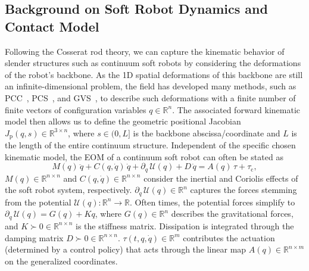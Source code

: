 \subsection{Background on Soft Robot Dynamics and Contact Model}
Following the Cosserat rod theory, we can capture the kinematic behavior of slender structures such as continuum soft robots by considering the deformations of the robot's backbone. As the 1D spatial deformations of this backbone are still an infinite-dimensional problem, the field has developed many methods, such as \gls{PCC}~\citep{webster2010design}, \gls{PCS}~\citep{renda2018discrete}, and \gls{GVS}~\citep{renda2020geometric}, to describe such deformations with a finite number of finite vectors of configuration variables $q \in \mathbb{R}^n$. The associated forward kinematic model then allows us to define the geometric positional Jacobian $J_\mathrm{p}(q, s) \in \mathbb{R}^{3 \times n}$, where $s \in (0,L]$ is the backbone abscissa/coordinate and $L$ is the length of the entire continuum structure.
Independent of the specific chosen kinematic model, the \gls{EOM} of a continuum soft robot can often be stated as~\citep{armanini2023soft, della2023model}
\begin{equation}\label{eq:safetymetric:soft_robot_configuration_space_dynamics}
    M(q) \, \ddot{q} + C(q, \dot{q}) \, \dot{q} + \partial_{q} \, \mathcal{U}(q) + D \, \dot{q} = A(q) \, \tau + \tau_\mathrm{c},
\end{equation}
$M(q) \in \mathbb{R}^{n \times n}$ and $C(q, \dot{q}) \in \mathbb{R}^{n \times n}$ consider the inertial and Coriolis effects of the soft robot system, respectively.
$\partial_{q} \, \mathcal{U}(q) \in \mathbb{R}^n$ captures the forces stemming from the potential $\mathcal{U}(q): \mathbb{R}^n \to \mathbb{R}$.
Often times, the potential forces simplify to $\partial_{q} \, \mathcal{U}(q) =  G(q) + K q$, where $G(q) \in \mathbb{R}^{n}$ describes the gravitational forces, and $K \succ 0 \in \mathbb{R}^{n \times n}$ is the stiffness matrix.
Dissipation is integrated through the damping matrix $D \succ 0 \in \mathbb{R}^{n \times n}$.
$\tau(t,q,\dot{q}) \in \mathbb{R}^{m}$ contributes the actuation (determined by a control policy) that acts through the linear map $A(q) \in \mathbb{R}^{n \times m}$ on the generalized coordinates.

